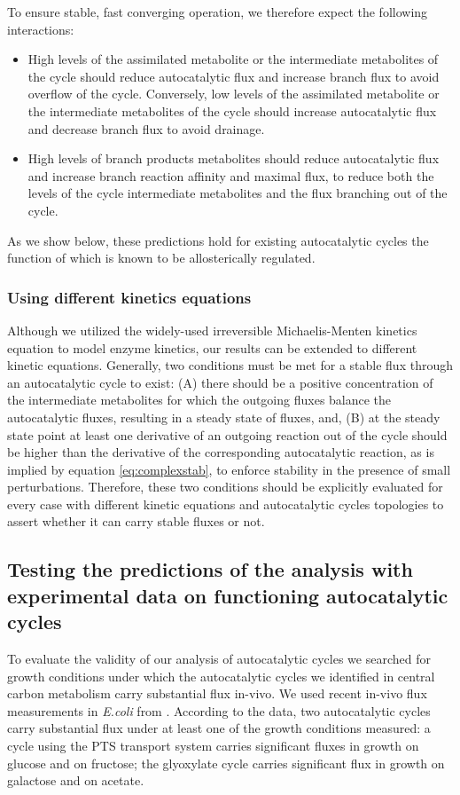     To ensure stable, fast converging operation, we therefore expect the following interactions:
    \begin{itemize}
        \item High levels of the assimilated metabolite or the intermediate metabolites of the cycle should reduce autocatalytic flux and increase branch flux to avoid overflow of the cycle.
            Conversely, low levels of the assimilated metabolite or the intermediate metabolites of the cycle should increase autocatalytic flux and decrease branch flux to avoid drainage.
        \item High levels of branch products metabolites should reduce autocatalytic flux and increase branch reaction affinity and maximal flux, to reduce both the levels of the cycle intermediate metabolites and the flux branching out of the cycle.
    \end{itemize}

    As we show below, these predictions hold for existing autocatalytic cycles the function of which is known to be allosterically regulated.

    \subsubsection{Using different kinetics equations}
    Although we utilized the widely-used irreversible Michaelis-Menten kinetics equation to model enzyme kinetics, our results can be extended to different kinetic equations.
    Generally, two conditions must be met for a stable flux through an autocatalytic cycle to exist: (A) there should be a positive concentration of the intermediate metabolites for which the outgoing fluxes balance the autocatalytic fluxes, resulting in a steady state of fluxes, and, (B) at the steady state point at least one derivative of an outgoing reaction out of the cycle should be higher than the derivative of the corresponding autocatalytic reaction, as is implied by equation \ref{eq:complexstab}, to enforce stability in the presence of small perturbations.
    Therefore, these two conditions should be explicitly evaluated for every case with different kinetic equations and autocatalytic cycles topologies to assert whether it can carry stable fluxes or not.

    \subsection{Testing the predictions of the analysis with experimental data on functioning autocatalytic cycles}
    To evaluate the validity of our analysis of autocatalytic cycles we searched for growth conditions under which the autocatalytic cycles we identified in central carbon metabolism carry substantial flux in-vivo.
    We used recent in-vivo flux measurements in \emph{E.coli} from \cite{Gerosa2015-oq}.
    According to the data, two autocatalytic cycles carry substantial flux under at least one of the growth conditions measured:
    a cycle using the PTS transport system carries significant fluxes in growth on glucose and on fructose;
    the glyoxylate cycle carries significant flux in growth on galactose and on acetate.

